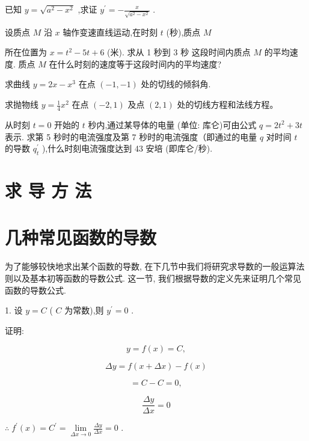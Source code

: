 \documentclass[lang=cn,newtx,10pt,scheme=chinese]{elegantbook}
\begin{document}
\begin{problemset}[习 题 四]
\item 已知 \(y = \sqrt{{a}^{2} - {x}^{2}}\) ,求证 \({y}^{\prime } = - \frac{x}{\sqrt{{a}^{2} - {x}^{2}}}\) .

\item 设质点 \(M\) 沿 \(x\) 轴作变速直线运动,在时刻 \(t\) (秒),质点 \(M\)

所在位置为 \(x = {t}^{2} - {5t} + 6\) (米). 求从 1 秒到 3 秒 这段时间内质点 \(M\) 的平均速度. 质点 \(M\) 在什么时刻的速度等于这段时间内的平均速度?

\item 求曲线 \(y = {2x} - {x}^{3}\) 在点 \(\left( {-1, - 1}\right)\) 处的切线的倾斜角.

\item 求抛物线 \(y = \frac{1}{4}{x}^{2}\) 在点 \(\left( {-2,1}\right)\) 及点 \(\left( {2,1}\right)\) 处的切线方程和法线方程。

\item 从时刻 \(t = 0\) 开始的 \(t\) 秒内,通过某导体的电量 (单位: 库仑)可由公式 \(q = 2{t}^{2} + {3t}\) 表示. 求第 5 秒时的电流强度及第 7 秒时的电流强度（即通过的电量 \(q\) 对时间 \(t\) 的导数 \({q}_{t}^{\prime }\) ),什么时刻电流强度达到 43 安培 (即库仑/秒).

\end{problemset}

\section*{求 导 方 法}

\section{几种常见函数的导数}

为了能够较快地求出某个函数的导数, 在下几节中我们将研究求导数的一般运算法则以及基本初等函数的导数公式. 这一节, 我们根据导数的定义先来证明几个常见函数的导数公式.

1. 设 \(y = C\) ( \(C\) 为常数),则 \({y}^{\prime } = 0\) .

证明:

\[
y = f\left( x\right) = C,
\]

\[
{\Delta y} = f\left( {x + {\Delta x}}\right) - f\left( x\right)
\]

\[
= C - C = 0,
\]

\[
\frac{\Delta y}{\Delta x} = 0
\]

\(\therefore \;{f}^{\prime }\left( x\right) = {C}^{\prime } = \mathop{\lim }\limits_{{{\Delta x} \rightarrow 0}}\frac{\Delta y}{\Delta x} = 0\) .
\end{document}
